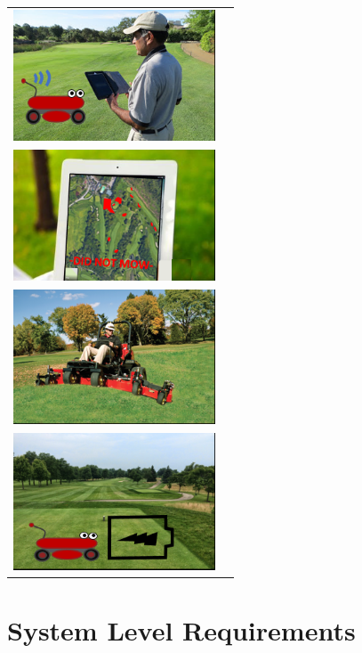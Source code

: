 \documentclass[12pt]{extarticle}
\begin{document}
\begin{table}[H]
  \def\arraystretch{5}

\begin{tabular}{cl}
\includegraphics[width=6cm]{usecase2_2.png} \\
\includegraphics[width=6cm]{usecase2_3.png} \\
\includegraphics[width=6cm]{usecase2_4.png} \\
\includegraphics[width=6cm]{usecase2_5.png} \\

\end{tabular}
\end{table}

\newpage
\section{System Level Requirements}
\end{document}
